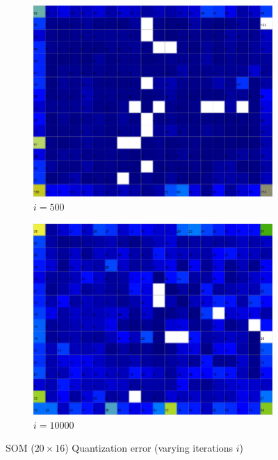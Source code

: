 \documentclass{acm_proc_article-sp}
\begin{document}
\begin{figure}
\begin{subfigure}[b]{0.24\linewidth}
    \end{subfigure}
    \begin{subfigure}[b]{0.24\linewidth}
        \includegraphics[width=\linewidth]{img/wine-newmid-quantization-error-i-500}
        \caption{$i=500$}
        \label{fig:wine-newmid-quantization-error-i-500}
    \end{subfigure}
    \begin{subfigure}[b]{0.24\linewidth}
        \includegraphics[width=\linewidth]{img/wine-newmid-quantization-error-i-10000}
        \caption{$i=10000$}
        \label{fig:wine-newmid-quantization-error-i-10000}
    \end{subfigure}
    \caption{SOM ($20\times16$) Quantization error (varying iterations $i$)}
    \label{fig:wine-newmid-quantization-error-i}
\end{figure}
\end{document}
